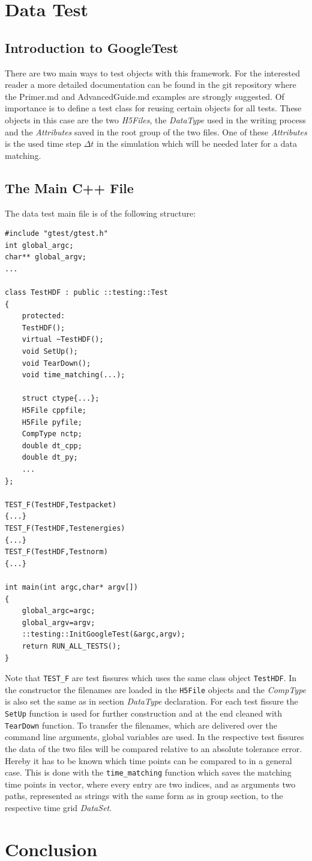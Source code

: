 \chapter{Data Test}

\section{Introduction to GoogleTest}
There are two main ways to test objects with this framework. For the interested reader a more detailed documentation can be found in the git repository \cite{googletestdoc} where the Primer.md and AdvancedGuide.md examples are strongly suggested. Of importance is to define a test class for reusing certain objects for all tests. These objects in this case are the two \textit{H5Files}, the \textit{DataType} used in the writing process and the \textit{Attributes} saved in the root group of the two files. One of these \textit{Attributes} is the used time step $\Delta t$ in the simulation which will be needed later for a data matching.

\section{The Main C++ File}
The data test main file is of the following structure:
\begin{lstlisting}
#include "gtest/gtest.h"
int global_argc;
char** global_argv;
...

class TestHDF : public ::testing::Test
{
	protected:
	TestHDF();
	virtual ~TestHDF();
	void SetUp();
	void TearDown();
	void time_matching(...);
	
	struct ctype{...};
	H5File cppfile;
	H5File pyfile;
	CompType nctp;
	double dt_cpp;
	double dt_py;
	...
};

TEST_F(TestHDF,Testpacket)
{...}
TEST_F(TestHDF,Testenergies)
{...}
TEST_F(TestHDF,Testnorm)
{...}

int main(int argc,char* argv[])
{
	global_argc=argc;
	global_argv=argv;
	::testing::InitGoogleTest(&argc,argv);
	return RUN_ALL_TESTS();
}
\end{lstlisting}

Note that \texttt{TEST\_F} are test fissures which uses the same class object \texttt{TestHDF}. In the constructor the filenames are loaded in the \texttt{H5File} objects and the \textit{CompType} is also set the same as in section \textit{DataType} declaration. For each test fissure the \texttt{SetUp} function is used for further construction and at the end cleaned with \texttt{TearDown} function. To transfer the filenames, which are delivered over the command line arguments, global variables are used. In the respective test fissures the data of the two files will be compared relative to an absolute tolerance error. Hereby it has to be known which time points can be compared to in a general case. This is done with the \texttt{time\_matching} function which saves the matching time points in vector, where every entry are two indices, and as arguments two paths, represented as strings with the same form as in group section, to the respective time grid \textit{DataSet}.

\chapter{Conclusion}

